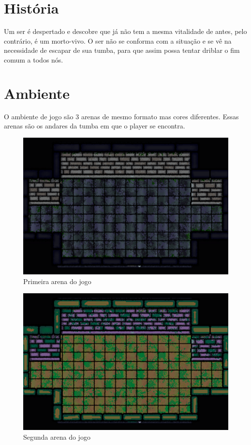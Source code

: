 \documentclass[a4paper]{scrreprt}
\begin{document}
    \section{História}
        Um ser é despertado e descobre que já não tem a mesma vitalidade de antes, pelo contrário, é um morto-vivo. O ser não se conforma com a situação e se vê na necessidade de escapar de sua tumba, para que assim possa tentar driblar o fim comum a todos nós.

    \section{Ambiente}
        O ambiente de jogo são 3 arenas de mesmo formato mas cores diferentes. Essas arenas são os andares da tumba em que o player se encontra.
            \begin{figure}[H]
                \centering
                \includegraphics[width=.6\linewidth]{arena_2.png}
                \caption{Primeira arena do jogo}
                \label{fig:arena_2}
            \end{figure}
            
            \begin{figure}[H]
                \centering
                \includegraphics[width=.6\linewidth]{arena_1.png}
                \caption{Segunda arena do jogo}
                \label{fig:arena_1}
            \end{figure}
\end{document}
